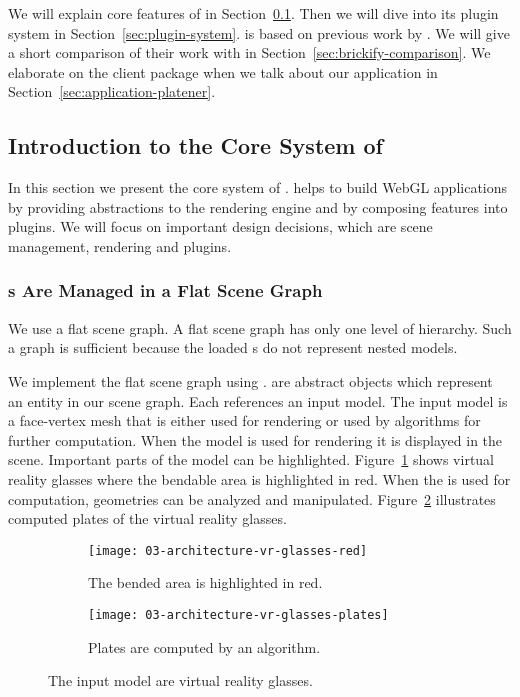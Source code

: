 \documentclass[../../ClassicThesis.tex]{subfiles}
\begin{document}
We will explain core features of {\convertify} in
Section~\ref{sec:convertify-core-features}. Then we will dive into
its plugin system in Section~\ref{sec:plugin-system}. {\convertify} is
based on previous work by \citet{bachelor-thesis}. We will give a
short comparison of their work with {\convertify} in
Section~\ref{sec:brickify-comparison}. We elaborate on the client
package when we talk about our application {\platener} in
Section~\ref{sec:application-platener}.

\subsection{Introduction to the Core System of {\convertify}}
\label{sec:convertify-core-features}

In this section we present the core system of {\convertify}.
{\convertify} helps to build WebGL applications by providing
abstractions to the rendering engine and by composing
features into plugins. We will focus on important design
decisions, which are scene management, rendering and
plugins.

\subsubsection{{\threedmodel}s Are Managed in a Flat Scene
  Graph}

We use a flat scene graph. A flat scene graph has only one
level of hierarchy. Such a graph is sufficient because the
loaded {\stlfile}s do not represent nested models.

We implement the flat scene graph using .
 are abstract objects which represent an entity
in our scene graph. Each  references an input
model. The input model is a face-vertex mesh that is either
used for rendering or used by algorithms for further
computation. When the model is used for rendering it is
displayed in the scene. Important parts of the model can be
highlighted. Figure~\ref{fig:vr-glasses:red} shows virtual
reality glasses where the bendable area is highlighted in
red. When the {\threedmodel} is used for computation,
geometries can be analyzed and manipulated.
Figure~\ref{fig:vr-glasses:plates} illustrates computed
plates of the virtual reality glasses.

\begin{figure}[h]
  \centering
  \begin{subfigure}[b]{0.49\textwidth}
    \texttt{[image: 03-architecture-vr-glasses-red]}
    \caption{The bended area is highlighted in red.}
    \label{fig:vr-glasses:red}
  \end{subfigure}
  \begin{subfigure}[b]{0.49\textwidth}
    \texttt{[image: 03-architecture-vr-glasses-plates]}
    \caption{Plates are computed by an algorithm.}
    \label{fig:vr-glasses:plates}
  \end{subfigure}
  \caption{The input model are virtual reality glasses.}
  \label{fig:vr-glasses}
\end{figure}
\end{document}
